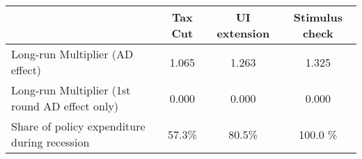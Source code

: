 \begin{tabular}{@{}lccc@{}}
\toprule
& Tax Cut    & UI extension    & Stimulus check    \\  \midrule
Long-run Multiplier (AD effect) &1.065  & 1.263  & 1.325     \\
Long-run Multiplier (1st round AD effect only) &0.000  & 0.000  & 0.000     \\
Share of policy expenditure during recession &57.3\%  & 80.5\%  & 100.0 \%    \\
\end{tabular}
